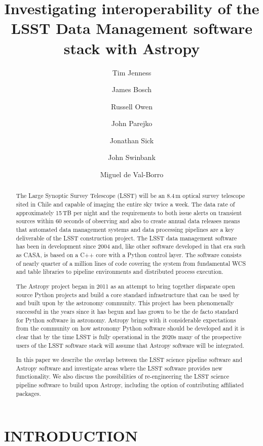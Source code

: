 \documentclass[]{spie}  %
\title{Investigating interoperability of the LSST Data Management software stack with Astropy}
\author[a]{Tim Jenness}
\author[b]{James Bosch}
\author[c]{Russell Owen}
\author[c]{John Parejko}
\author[a]{Jonathan Sick}
\author[b]{John Swinbank}
\author[b]{Miguel de Val-Borro}
\affil[a]{LSST Project Management Office, Tucson, AZ, U.S.A.}
\affil[b]{Princeton University, Princeton, NJ, U.S.A.}
\affil[c]{University of Washington, Seattle, WA, U.S.A}
\begin{document}
\maketitle

\begin{abstract}
  The Large Synoptic Survey Telescope (LSST) will be an 8.4\,m optical survey telescope sited in Chile and capable of imaging the entire sky twice a week.
  The data rate of approximately 15\,TB per night and the requirements to both issue alerts on transient sources within 60 seconds of observing and also to create annual data releases means that automated data management systems and data processing pipelines are a key deliverable of the LSST construction project.
  The LSST data management software has been in development since 2004 and, like other software developed in that era such as CASA, is based on a C++ core with a Python control layer.
  The software consists of nearly quarter of a million lines of code covering the system from fundamental WCS and table libraries to pipeline environments and distributed process execution.

  The Astropy project began in 2011 as an attempt to bring together disparate open source Python projects and build a core standard infrastructure that can be used by and built upon by the astronomy community.
  This project has been phenomenally successful in the years since it has begun and has grown to be the de facto standard for Python software in astronomy.
  Astropy brings with it considerable expectations from the community on how astronomy Python software should be developed and it is clear that by the time LSST is fully operational in the 2020s many of the prospective users of the LSST software stack will assume that Astropy software will be integrated.

  In this paper we describe the overlap between the LSST science pipeline software and Astropy software and investigate areas where the LSST software provides new functionality.
  We also discuss the possibilities of re-engineering the LSST science pipeline software to build upon Astropy, including the option of contributing affiliated packages.
\end{abstract}


\section{INTRODUCTION}
\label{sec:intro}  %
\end{document}

